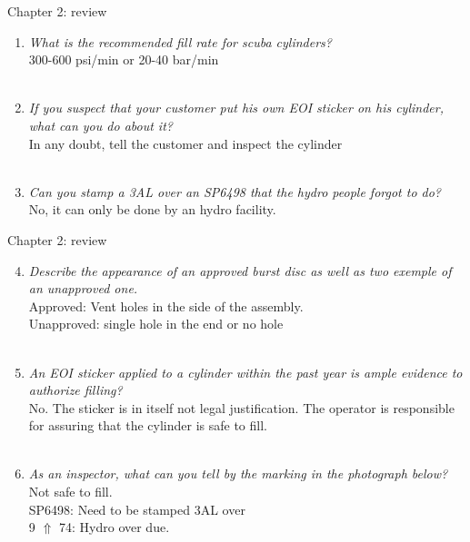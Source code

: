 \documentclass[aspectratio=1610,english,12pt]{beamer}
\begin{document}
\begin{frame}{Chapter 2: review}
	\begin{enumerate}
		\item \textit{What is the recommended fill rate for scuba cylinders?}\\
				300-600 psi/min or 20-40 bar/min\\~\\
		\item \textit{If you suspect that your customer put his own EOI sticker on his cylinder, what can you do about it?}\\
				In any doubt, tell the customer and inspect the cylinder\\~\\
		\item \textit{Can you stamp a 3AL over an SP6498 that the hydro people forgot to do?}\\
				No, it can only be done by an hydro facility.
	\end{enumerate}
\end{frame}

\begin{frame}{Chapter 2: review}
	\begin{enumerate}
		\setcounter{enumi}{3}
		\item \textit{Describe the appearance of an approved burst disc as well as two exemple of an unapproved one.}\\
				Approved: Vent holes in the side of the assembly.\\
				Unapproved: single hole in the end or no hole \\~\\ 
		\item \textit{An EOI sticker applied to a cylinder within the past year is ample evidence to authorize filling?}\\
				No. The sticker is in itself not legal justification. The operator is responsible for assuring that the cylinder is safe to fill.\\~\\
		\item \textit{As an inspector, what can you tell by the marking in the photograph below?}
				Not safe to fill.\\
				SP6498: Need to be stamped 3AL over\\
				9  $\Uparrow$ 74: Hydro over due. 
	\end{enumerate}
\end{frame}

\end{document}
